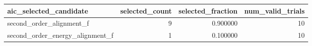 \begin{tabular}{lrrr}
\toprule
aic_selected_candidate & selected_count & selected_fraction & num_valid_trials \\
\midrule
second_order_alignment_f & 9 & 0.900000 & 10 \\
second_order_energy_alignment_f & 1 & 0.100000 & 10 \\
\bottomrule
\end{tabular}
